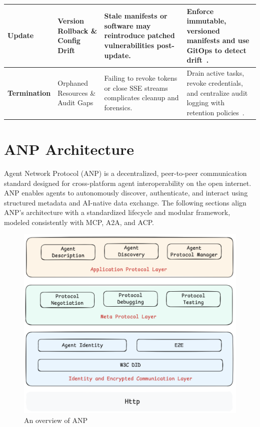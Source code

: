 \documentclass{article}
\begin{document}
\begin{table}[ht]
\begin{tabularx}{\textwidth}{|
    >{\centering\arraybackslash}p{2.1cm}|
    >{\raggedright\arraybackslash}X|
    >{\raggedright\arraybackslash}X|
    >{\raggedright\arraybackslash}X
|}
    \hline

    \textbf{Update}
    & Version Rollback \& Config Drift
    & Stale manifests or software may reintroduce patched vulnerabilities post-update.
    & Enforce immutable, versioned manifests and use GitOps to detect drift~\cite{acmAgents2025}. \\

    \hline

    \textbf{Termination}
    & Orphaned Resources \& Audit Gaps
    & Failing to revoke tokens or close SSE streams complicates cleanup and forensics.
    & Drain active tasks, revoke credentials, and centralize audit logging with retention policies~\cite{acmAgents2025}. \\

    \hline
  \end{tabularx}
\end{table}


\section{ANP Architecture}
Agent Network Protocol (ANP) is a decentralized, peer-to-peer communication standard designed for cross-platform agent interoperability on the open internet. ANP enables agents to autonomously discover, authenticate, and interact using structured metadata and AI-native data exchange. The following sections align ANP's architecture with a standardized lifecycle and modular framework, modeled consistently with MCP, A2A, and ACP.

\begin{figure}
    \centering
    \includegraphics[width=0.55\linewidth]{anp-architecture.png}
    \caption{An overview of ANP \cite{anp2024website,anp2024github}}
    \label{fig:ANP}
\end{figure}
\end{document}

